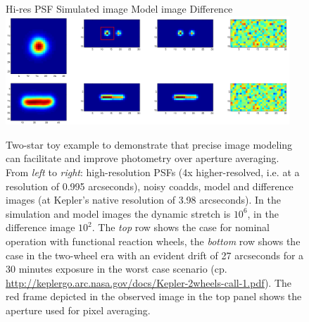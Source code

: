 \documentclass[letterpaper,12pt,whitepaper]{haastex}
\begin{document}
\begin{figure}[t]
\begin{center}
\footnotesize
\hspace{-2mm}Hi-res PSF \hspace{18mm} Simulated image \hspace{16mm} Model image
\hspace{18mm} Difference\\
\includegraphics[width=0.95\textwidth]{photometry_with_psf_with_frame2.png}

\caption{Two-star toy example to demonstrate that precise image
  modeling can facilitate and improve photometry over aperture
  averaging. From \emph{left} to \emph{right}: high-resolution PSFs
  (4x higher-resolved, i.e. at a resolution of 0.995 arcseconds),
  noisy coadds, model and difference images (at Kepler's native
  resolution of 3.98 arcseconds). In the simulation and model images
  the dynamic stretch is $10^6$, in the difference image $10^2$. The
  \emph{top} row shows the case for nominal operation with functional
  reaction wheels, the \emph{bottom} row shows the case in the
  two-wheel era with an evident drift of 27 arcseconds for a 30 minutes
  exposure in the worst case scenario (cp.
  \url{http://keplergo.arc.nasa.gov/docs/Kepler-2wheels-call-1.pdf}). The
  red frame depicted in the observed image in the top panel shows the
  aperture used for pixel averaging.}
\end{center}
\label{fig:photometry}
\end{figure}
\end{document}
